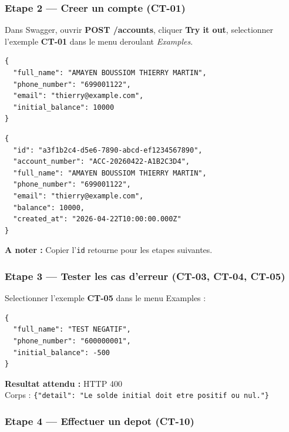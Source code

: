 \documentclass[12pt,a4paper]{article}
\begin{document}
\subsubsection{Etape 2 --- Creer un compte (CT-01)}

Dans Swagger, ouvrir \textbf{POST /accounts}, cliquer \textbf{Try it out}, selectionner l'exemple \textbf{CT-01} dans le menu deroulant \textit{Examples}.

\begin{lstlisting}[style=json, caption={Corps de la requete}]
{
  "full_name": "AMAYEN BOUSSIOM THIERRY MARTIN",
  "phone_number": "699001122",
  "email": "thierry@example.com",
  "initial_balance": 10000
}
\end{lstlisting}

\begin{lstlisting}[style=json, caption={Reponse attendue --- HTTP 201}]
{
  "id": "a3f1b2c4-d5e6-7890-abcd-ef1234567890",
  "account_number": "ACC-20260422-A1B2C3D4",
  "full_name": "AMAYEN BOUSSIOM THIERRY MARTIN",
  "phone_number": "699001122",
  "email": "thierry@example.com",
  "balance": 10000,
  "created_at": "2026-04-22T10:00:00.000Z"
}
\end{lstlisting}

\begin{infobox}
\textbf{A noter :} Copier l'\texttt{id} retourne pour les etapes suivantes.
\end{infobox}

\subsubsection{Etape 3 --- Tester les cas d'erreur (CT-03, CT-04, CT-05)}

Selectionner l'exemple \textbf{CT-05} dans le menu Examples :
\begin{lstlisting}[style=json, caption={Test CT-05 : solde negatif}]
{
  "full_name": "TEST NEGATIF",
  "phone_number": "600000001",
  "initial_balance": -500
}
\end{lstlisting}

\begin{dangerbox}
\textbf{Resultat attendu :} HTTP 400\\
Corps : \texttt{\{"detail": "Le solde initial doit etre positif ou nul."\}}
\end{dangerbox}

\subsubsection{Etape 4 --- Effectuer un depot (CT-10)}
\end{document}

